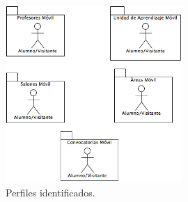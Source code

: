     \begin{figure}[h!]
	\begin{center}
		\includegraphics[width=0.6\textwidth]{images/actores/Actoresmovil.png}
		\caption{Perfiles identificados.}
		\label{fig:perfilesMovil}
	\end{center}
\end{figure}
